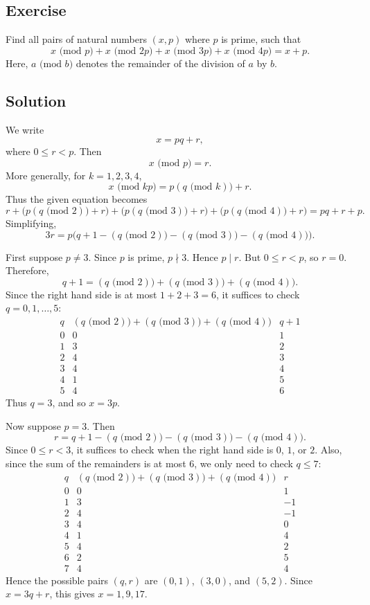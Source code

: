 \documentclass{article}
\newcounter{counter}
\newcommand{\Exercise}{Exercise \stepcounter{counter}\thecounter}
\begin{document}
\subsection*{\Exercise}
    Find all pairs of natural numbers $(x, p)$ where $p$ is prime, such that $$x \text{ (mod }p) + x \text{ (mod }2p) + x \text{ (mod }3p) + x \text{ (mod }4p) = x + p.$$
    Here, $a \text{ (mod }b)$ denotes the remainder of the division of $a$ by $b$.

\subsection*{Solution}
    We write
    $$x = pq + r,$$
    where $0 \le r < p$. Then
    $$x \text{ (mod }p) = r.$$
    More generally, for $k = 1, 2, 3, 4$,
    $$x \text{ (mod }kp) = p(q \text{ (mod }k)) + r.$$
    Thus the given equation becomes
    $$r + \big(p(q \text{ (mod }2)) + r\big)
    + \big(p(q \text{ (mod }3)) + r\big)
    + \big(p(q \text{ (mod }4)) + r\big)
    = pq + r + p.$$
    Simplifying,
    $$3r = p\Big(q + 1 - (q \text{ (mod }2)) - (q \text{ (mod }3)) - (q \text{ (mod }4))\Big).$$

    First suppose $p \neq 3$. Since $p$ is prime, $p \nmid 3$. Hence $p \mid r$. But $0 \le r < p$, so $r = 0$. Therefore,
    $$q + 1 = (q \text{ (mod }2)) + (q \text{ (mod }3)) + (q \text{ (mod }4)).$$
    Since the right hand side is at most $1 + 2 + 3 = 6$, it suffices to check $q = 0, 1, \dots, 5$:
    $$
    \begin{array}{c|c|c}
        q & (q \text{ (mod }2)) + (q \text{ (mod }3)) + (q \text{ (mod }4)) & q + 1 \\ \hline
        0 & 0 & 1 \\
        1 & 3 & 2 \\
        2 & 4 & 3 \\
        3 & 4 & 4 \\
        4 & 1 & 5 \\
        5 & 4 & 6
    \end{array}
    $$
    Thus $q = 3$, and so $x = 3p$.

    Now suppose $p = 3$. Then
    $$r = q + 1 - (q \text{ (mod }2)) - (q \text{ (mod }3)) - (q \text{ (mod }4)).$$
    Since $0 \le r < 3$, it suffices to check when the right hand side is $0$, $1$, or $2$. Also, since the sum of the remainders is at most $6$, we only need to check $q \le 7$:
    $$
    \begin{array}{c|c|c}
        q & (q \text{ (mod }2)) + (q \text{ (mod }3)) + (q \text{ (mod }4)) & r \\ \hline
        0 & 0 & 1 \\
        1 & 3 & -1 \\
        2 & 4 & -1 \\
        3 & 4 & 0 \\
        4 & 1 & 4 \\
        5 & 4 & 2 \\
        6 & 2 & 5 \\
        7 & 4 & 4
    \end{array}
    $$
    Hence the possible pairs $(q,r)$ are $(0,1)$, $(3,0)$, and $(5,2)$. Since $x = 3q + r$, this gives $x = 1, 9, 17$.
\end{document}
